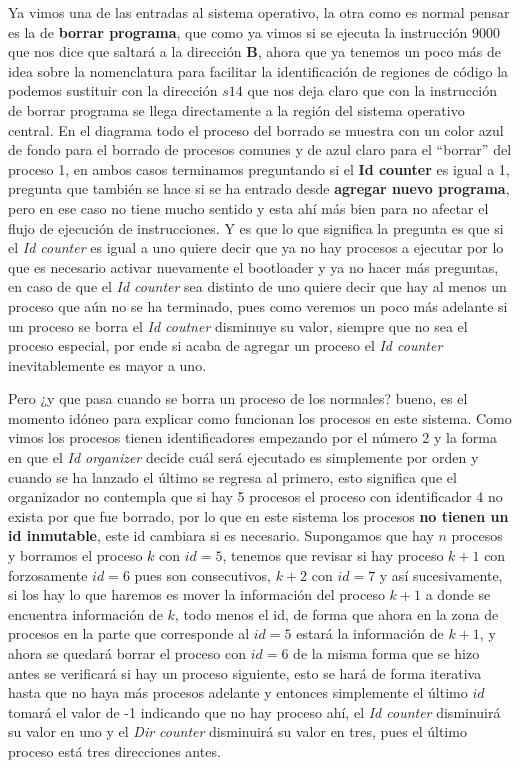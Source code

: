 \documentclass[12pt]{article}
\begin{document}
   
   Ya vimos una de las entradas al sistema operativo, la otra como es normal pensar es la de \textbf{borrar programa},
   que como ya vimos si se ejecuta la instrucción $9000$ que nos dice que saltará a la dirección \textbf{B}, ahora que
   ya tenemos un poco más de idea sobre la nomenclatura para facilitar la identificación de regiones
   de código la podemos sustituir con la dirección $s14$ que nos deja claro que con la instrucción de borrar programa
   se llega directamente a la región del sistema operativo central. En el diagrama todo el proceso del borrado se muestra
   con un color azul de fondo para el borrado de procesos comunes y de azul claro para el ``borrar'' del proceso 1, en
   ambos casos terminamos preguntando si el \textbf{Id counter} es igual a 1, pregunta que también se hace si se ha entrado
   desde \textbf{agregar nuevo programa}, pero en ese caso no tiene mucho sentido y esta ahí más bien para no afectar el
   flujo de ejecución de instrucciones. Y es que lo que significa la pregunta es que si el \textit{Id counter} es igual
   a uno quiere decir que ya no hay procesos a ejecutar por lo que es necesario activar nuevamente el bootloader
   y ya no hacer más preguntas, en caso de que el \textit{Id counter} sea distinto de uno quiere decir que hay al menos un
   proceso que aún no se ha terminado, pues como veremos un poco más adelante si un proceso se borra el \textit{Id coutner}
   disminuye su valor, siempre que no sea el proceso especial, por ende si acaba de agregar un proceso el \textit{Id counter}
   inevitablemente es mayor a uno.
   
   Pero ¿y que pasa cuando se borra un proceso de los normales? bueno, es el momento idóneo para explicar como 
   funcionan los procesos en este sistema. Como vimos los procesos tienen identificadores empezando por el número 2
   y la forma en que el \textit{Id organizer} decide cuál será ejecutado es simplemente por orden y cuando se ha lanzado el
   último se regresa al primero, esto significa que el organizador no contempla que si hay 5 procesos el proceso con identificador
   4 no exista por que fue borrado, por lo que en este sistema los procesos \textbf{no tienen un id inmutable}, este id cambiara
   si es necesario. Supongamos que hay $n$ procesos y borramos el proceso $k$ con $id=5$, tenemos que revisar si hay proceso $k+1$
   con forzosamente $id=6$ pues son consecutivos,
   $k+2$ con $id=7$ y así sucesivamente, si los hay lo que haremos es mover la información del proceso $k+1$ a donde se encuentra
   información de $k$, todo menos el id, de forma que ahora en la zona de procesos en la parte que corresponde al $id=5$
   estará la información de $k+1$, y ahora se quedará borrar el proceso con $id=6$ de la misma forma que se
   hizo antes se verificará si hay un proceso siguiente, esto se hará de forma iterativa hasta que no haya más procesos adelante
   y entonces simplemente el último $id$ tomará el valor de -1 indicando que no hay proceso ahí, el \textit{Id counter}
   disminuirá su valor en uno y el \textit{Dir counter} disminuirá su valor en tres, pues el último proceso
   está tres direcciones antes.
   
\end{document}
